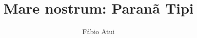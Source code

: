 \documentclass[12pt]{extarticle}
\begin{document}
\newcommand{\AutorLivro}{Fábio Atui}
\newcommand{\TituloLivro}{Mare nostrum: Paranã Tipi}
\newcommand{\Tema}{Ficção, mistério e fantasia}
\newcommand{\Genero}{Romance}
\newcommand{\imagemCapa}{./images/PNLD0008-01.png}
\newcommand{\issnppub}{---}
\newcommand{\issnepub}{---}
\newcommand{\colaborador}{Bruno Gradella e Vicente Castro}


\title{\TituloLivro}
\author{\AutorLivro}
\def\authornotes{\colaborador}

\date{}
\maketitle

\baselineskip\par
\end{document}
